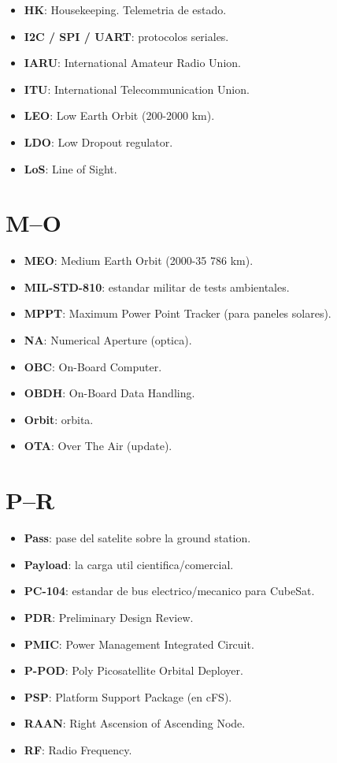 \documentclass[11pt,a4paper,oneside,openright]{book}
\begin{document}
\begin{itemize}[leftmargin=2em]
  \item \textbf{HK}: Housekeeping. Telemetria de estado.
  \item \textbf{I2C / SPI / UART}: protocolos seriales.
  \item \textbf{IARU}: International Amateur Radio Union.
  \item \textbf{ITU}: International Telecommunication Union.
  \item \textbf{LEO}: Low Earth Orbit (200-2000 km).
  \item \textbf{LDO}: Low Dropout regulator.
  \item \textbf{LoS}: Line of Sight.
\end{itemize}

\section*{M--O}

\begin{itemize}[leftmargin=2em]
  \item \textbf{MEO}: Medium Earth Orbit (2000-35 786 km).
  \item \textbf{MIL-STD-810}: estandar militar de tests ambientales.
  \item \textbf{MPPT}: Maximum Power Point Tracker (para paneles solares).
  \item \textbf{NA}: Numerical Aperture (optica).
  \item \textbf{OBC}: On-Board Computer.
  \item \textbf{OBDH}: On-Board Data Handling.
  \item \textbf{Orbit}: orbita.
  \item \textbf{OTA}: Over The Air (update).
\end{itemize}

\section*{P--R}

\begin{itemize}[leftmargin=2em]
  \item \textbf{Pass}: pase del satelite sobre la ground station.
  \item \textbf{Payload}: la carga util cientifica/comercial.
  \item \textbf{PC-104}: estandar de bus electrico/mecanico para CubeSat.
  \item \textbf{PDR}: Preliminary Design Review.
  \item \textbf{PMIC}: Power Management Integrated Circuit.
  \item \textbf{P-POD}: Poly Picosatellite Orbital Deployer.
  \item \textbf{PSP}: Platform Support Package (en cFS).
  \item \textbf{RAAN}: Right Ascension of Ascending Node.
  \item \textbf{RF}: Radio Frequency.
\end{itemize}
\end{document}
